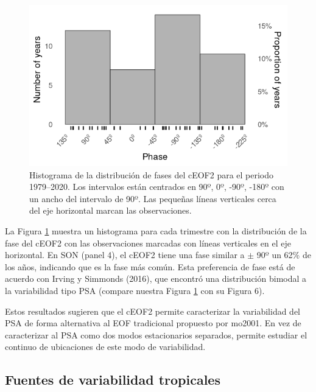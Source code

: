 \documentclass[12pt,oneside,a4paper]{reedthesis}
\begin{document}
\begin{figure}

{\centering \includegraphics{figures/20-ceofs/phase-histogram-1} 

}

\caption{Histograma de la distribución de fases del cEOF2 para el periodo 1979--2020.
Los intervalos están centrados en 90º, 0º, -90º, -180º con un ancho del intervalo de 90º.
Las pequeñas líneas verticales cerca del eje horizontal marcan las observaciones.}\label{fig:phase-histogram}
\end{figure}

La Figura \ref{fig:phase-histogram} muestra un histograma para cada trimestre con la distribución de la fase del cEOF2 con las observaciones marcadas con líneas verticales en el eje horizontal.
En SON (panel 4), el cEOF2 tiene una fase similar a \(\pm\) 90º un 62\% de los años, indicando que es la fase más común.
Esta preferencia de fase está de acuerdo con Irving y Simmonds (2016), que encontró una distribución bimodal a la variabilidad tipo PSA (compare nuestra Figura \ref{fig:phase-histogram} con su Figura 6).

Estos resultados sugieren que el cEOF2 permite caracterizar la variabilidad del PSA de forma alternativa al EOF tradicional propuesto por mo2001.
En vez de caracterizar al PSA como dos modos estacionarios separados, permite estudiar el continuo de ubicaciones de este modo de variabilidad.

\hypertarget{fuentes-ceof}{%
\subsection{Fuentes de variabilidad tropicales}\label{fuentes-ceof}}
\end{document}
